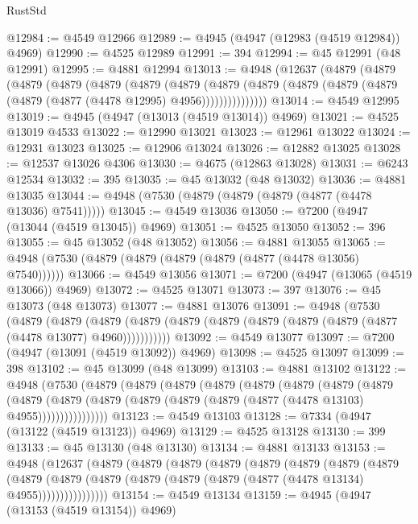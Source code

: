 \begin{lexlean}{RustStd}
\begin{coremodule}
@12984 := @4549 @12966
@12989 := @4945 (@4947 (@12983 (@4519 @12984)) @4969)
@12990 := @4525 @12989
@12991 := 394
@12994 := @45 @12991 (@48 @12991)
@12995 := @4881 @12994
@13013 := @4948
    (@12637
      (@4879
        (@4879
          (@4879
            (@4879
              (@4879
                (@4879
                  (@4879
                    (@4879
                      (@4879 (@4879 (@4879 (@4879 (@4879 (@4877 (@4478 @12995) @4956)))))))))))))))
@13014 := @4549 @12995
@13019 := @4945 (@4947 (@13013 (@4519 @13014)) @4969)
@13021 := @4525 @13019 @4533
@13022 := @12990 @13021
@13023 := @12961 @13022
@13024 := @12931 @13023
@13025 := @12906 @13024
@13026 := @12882 @13025
@13028 := @12537 @13026 @4306
@13030 := @4675 (@12863 @13028)
@13031 := @6243 @12534
@13032 := 395
@13035 := @45 @13032 (@48 @13032)
@13036 := @4881 @13035
@13044 := @4948 (@7530 (@4879 (@4879 (@4879 (@4877 (@4478 @13036) @7541)))))
@13045 := @4549 @13036
@13050 := @7200 (@4947 (@13044 (@4519 @13045)) @4969)
@13051 := @4525 @13050
@13052 := 396
@13055 := @45 @13052 (@48 @13052)
@13056 := @4881 @13055
@13065 := @4948 (@7530 (@4879 (@4879 (@4879 (@4879 (@4877 (@4478 @13056) @7540))))))
@13066 := @4549 @13056
@13071 := @7200 (@4947 (@13065 (@4519 @13066)) @4969)
@13072 := @4525 @13071
@13073 := 397
@13076 := @45 @13073 (@48 @13073)
@13077 := @4881 @13076
@13091 := @4948
    (@7530
      (@4879
        (@4879
          (@4879 (@4879 (@4879 (@4879 (@4879 (@4879 (@4879 (@4877 (@4478 @13077) @4960)))))))))))
@13092 := @4549 @13077
@13097 := @7200 (@4947 (@13091 (@4519 @13092)) @4969)
@13098 := @4525 @13097
@13099 := 398
@13102 := @45 @13099 (@48 @13099)
@13103 := @4881 @13102
@13122 := @4948
    (@7530
      (@4879
        (@4879
          (@4879
            (@4879
              (@4879
                (@4879
                  (@4879
                    (@4879
                      (@4879
                        (@4879
                          (@4879 (@4879 (@4879 (@4879 (@4877 (@4478 @13103) @4955))))))))))))))))
@13123 := @4549 @13103
@13128 := @7334 (@4947 (@13122 (@4519 @13123)) @4969)
@13129 := @4525 @13128
@13130 := 399
@13133 := @45 @13130 (@48 @13130)
@13134 := @4881 @13133
@13153 := @4948
    (@12637
      (@4879
        (@4879
          (@4879
            (@4879
              (@4879
                (@4879
                  (@4879
                    (@4879
                      (@4879
                        (@4879
                          (@4879 (@4879 (@4879 (@4879 (@4877 (@4478 @13134) @4955))))))))))))))))
@13154 := @4549 @13134
@13159 := @4945 (@4947 (@13153 (@4519 @13154)) @4969)

\end{coremodule}
\end{lexlean}
